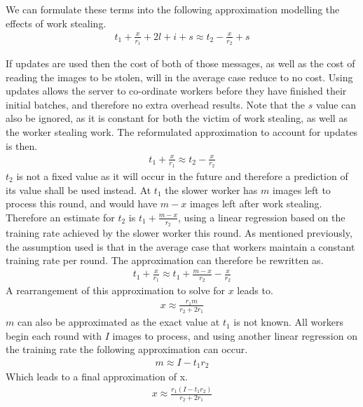 \documentclass[12pt]{article}
\begin{document}
We can formulate these terms into the following approximation modelling the effects of work stealing.
\begin{align*}
t_1 + \frac{x}{r_1} + 2l + i + s \approx t_2 - \frac{x}{r_2} + s
\end{align*}

If updates are used then the cost of both of those messages, as well as the cost of reading the images to be stolen, will in the average case reduce to no cost. Using updates allows the server to co-ordinate workers before they have finished their initial batches, and therefore no extra overhead results. Note that the $s$ value can also be ignored, as it is constant for both the victim of work stealing, as well as the worker stealing work.
\newline
The reformulated approximation to account for updates is then.
\begin{align*}
t_1 + \frac{x}{r_1} \approx t_2 - \frac{x}{r_2}
\end{align*}
$t_2$ is not a fixed value as it will occur in the future and therefore a prediction of its value shall be used instead. At $t_1$ the slower worker has $m$ images left to process this round, and would have $m -x $ images left after work stealing. Therefore an estimate for $t_2$ is $t_1 + \frac{m-x}{r_2}$, using a linear regression based on the training rate achieved by the slower worker this round. As mentioned previously, the assumption used is that in the average case that workers maintain a constant training rate per round.
\newline
The approximation can therefore be rewritten as.
\begin{align*}
t_1 + \frac{x}{r_1} \approx t_1 + \frac{m-x}{r_2} - \frac{x}{r_2}
\end{align*}
\newline
A rearrangement of this approximation to solve for $x$ leads to.
\begin{align*}
x \approx \frac{r_1m}{r_2 + 2r_1}
\end{align*}
$m$ can also be approximated as the exact value at $t_1$ is not known. All workers begin each round with $I$ images to process, and using another linear regression on the training rate the following approximation can occur.
\begin{align*}
m \approx I - t_1r_2
\end{align*}
\newline
Which leads to a final approximation of x.
\newline
\begin{align*}
x \approx \frac{r_1(I - t_1r_2)}{r_2 + 2r_1}
\end{align*}
\end{document}
